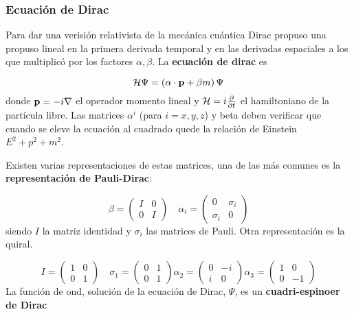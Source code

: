 \subsubsection{Ecuación de Dirac}


Para dar una verisión relativista de la mecánica cuántica Dirac propuso una propuso lineal en la primera derivada temporal y en las derivadas espaciales a los que multiplicó por los factores $\alpha,\beta$. La \textbf{ecuación de dirac} es

\begin{equation}
	\mathcal{H} \Psi = \left( \alpha \cdot \mathbf{p} + \beta m \right) \Psi
\end{equation}
donde $\mathbf{p}=-i\nabla$ el operador momento lineal y $\mathcal{H} = i \frac{\partial }{\partial t}$ el hamiltoniano de la partícula libre. Las matrices $\alpha^i$ (para $i=x,y,z$) y beta deben verificar que cuando se eleve la ecuación al cuadrado quede la relación de Einstein $E^2+p^2 + m^2$. 

Existen varias representaciones de estas matrices, una de las más comunes es la  \textbf{representación de Pauli-Dirac}:

\begin{equation}
	\beta = \begin{pmatrix}
 	I & 0 \\ 0 & I 
	\end{pmatrix} \quad 
	\alpha_i = \begin{pmatrix}
	0 & \sigma_i \\ \sigma_i & 0 
	\end{pmatrix}
\end{equation}
siendo $I$ la matriz identidad y $\sigma_i$ las matrices de Pauli. Otra representación es la quiral. 


\begin{equation}
	I = \begin{pmatrix}
		1 & 0 \\ 0 & 1
	\end{pmatrix} \quad 
	\sigma_1 = \begin{pmatrix}
		0 & 1 \\ 0 & 1 
	\end{pmatrix}
	\alpha_2 = \begin{pmatrix}
	0 & -i \\ i & 0 
	\end{pmatrix}
	\alpha_3 = \begin{pmatrix}
	1 & 0 \\ 0 & -1
	\end{pmatrix}
\end{equation}
La función de ond, solución de la ecuación de Dirac, $\Psi$, es un \textbf{cuadri-espinoer de Dirac} 


